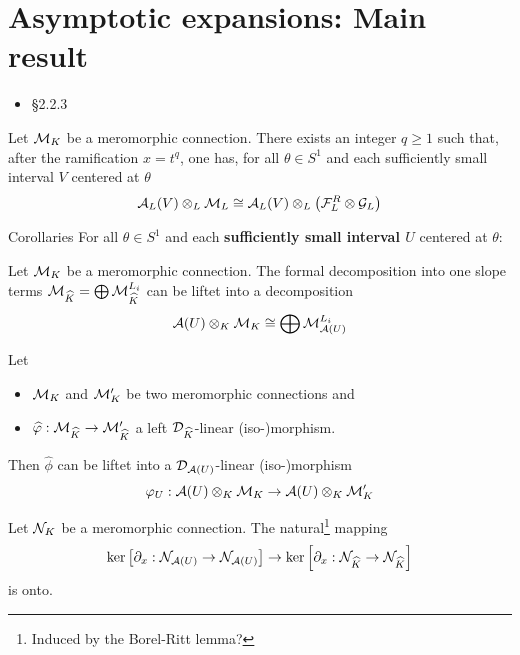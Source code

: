 \section{Asymptotic expansions: Main result}%
\begin{frame}[t]
  {\Huge\insertsection{}}
  \begin{itemize}
    \item \cite{sabbah_cimpa90} §2.2.3
  \end{itemize}

  \begin{thm}[2.3.1]
    Let $\mathcal{M}_K$ be a meromorphic connection. There exists an integer $q\geq 1$
    such that, after the ramification $x=t^q$, one has, for all $\theta\in S^1$
    and each sufficiently small interval $V$ centered at $\theta$
    \[
      \mathcal{A}_L(V)\otimes_L\mathcal{M}_L \cong
        \mathcal{A}_L(V)\otimes_L\left(\mathcal{F}_L^R\otimes\mathcal{G}_L\right)
    \]
  \end{thm}
\end{frame}

\begin{frame}[t]{Corollaries}
  For all $\theta\in S^1$ and each \textbf{sufficiently small interval $U$}
  centered
  at $\theta$:
  \begin{cor}[2.3.2]
    Let $\mathcal{M}_K$ be a meromorphic connection.
    The formal decomposition into one slope terms
    $\mathcal{M}_{\widehat K}=\bigoplus \mathcal{M}_{\widehat K}^{L_i}$ can be liftet into a
    decomposition
    \[
      \mathcal{A}(U)\otimes_K\mathcal{M}_K \cong \bigoplus\mathcal{M}_{\mathcal{A}(U)}^{L_i}
    \]
  \end{cor}
  \begin{cor}[2.3.3]
    Let
    \begin{itemize}
      \item $\mathcal{M}_K$ and $\mathcal{M}_K'$ be two meromorphic connections and
      \item $\widehat{\varphi}:\mathcal{M}_{\widehat{K}}\to\mathcal{M}_{\widehat{K}}'$ a left
        $\mathcal{D}_{\widehat K}$-linear \textcolor{green!40!black}{(iso-)}morphism.
    \end{itemize}
    Then
    $\hat\phi$ can be liftet into a $\mathcal{D}_{\mathcal{A}(U)}$-linear
    \textcolor{green!40!black}{(iso-)}morphism
    \[
      \varphi_U:\mathcal{A}(U)\otimes_K\mathcal{M}_K\to\mathcal{A}(U)\otimes_K\mathcal{M}_K'
    \]

    \begin{lem}[2.3.4]
      Let $\mathcal{N}_K$ be a meromorphic connection.
      The natural\footnote{Induced by the Borel-Ritt lemma?} mapping
      \[
        \ker\left[\partial_x:\mathcal{N}_{\mathcal{A}(U)}\to\mathcal{N}_{\mathcal{A}(U)}\right]
        \to
        \ker\left[\partial_x:\mathcal{N}_{\widehat K}\to\mathcal{N}_{\widehat K}\right]
      \]
      is onto.
    \end{lem}
  \end{cor}
\end{frame}

